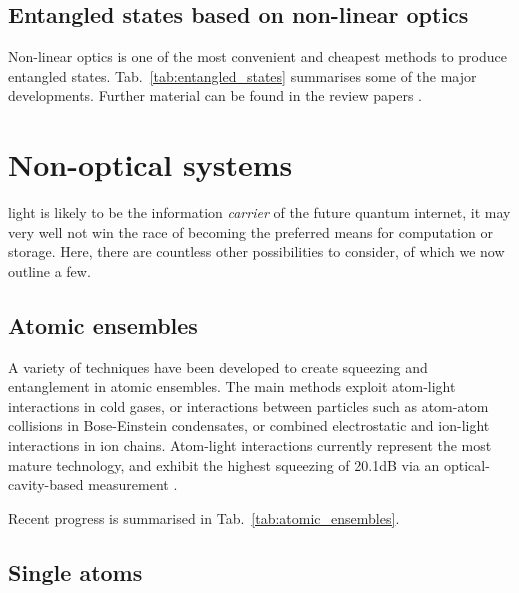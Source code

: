 \subsection{Entangled states based on non-linear optics} 

Non-linear optics is one of the most convenient and cheapest methods to produce entangled states. Tab.~\ref{tab:entangled_states} summarises some of the major developments. Further material can be found in the review papers \cite{bib:pan2012multiphoton, bib:ralph2009bright}.

%
%

\section{Non-optical systems}

 light is likely to be the information \textit{carrier} of the future quantum internet, it may very well not win the race of becoming the preferred means for computation or storage. Here, there are countless other possibilities to consider, of which we now outline a few.

%
%

\subsection{Atomic ensembles} 

A variety of techniques have been developed to create squeezing and entanglement in atomic ensembles. The main methods exploit atom-light interactions in cold gases, or interactions between particles such as atom-atom collisions in Bose-Einstein condensates, or combined electrostatic and ion-light interactions in ion chains. Atom-light interactions currently represent the most mature technology, and exhibit the highest squeezing of 20.1dB via an optical-cavity-based measurement \cite{bib:hosten2016measurement}.

Recent progress is summarised in Tab.~\ref{tab:atomic_ensembles}.

%
%

\subsection{Single atoms} 

